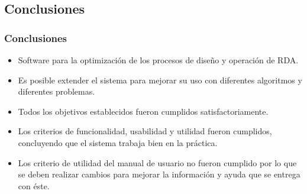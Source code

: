 \documentclass[9pt]{beamer}
\begin{document}
    \subsection{Conclusiones}
    \begin{frame}
        \frametitle{Conclusiones}                       
        
        \begin{itemize}
            \item Software para la optimización de los procesos de diseño y operación  de RDA.
            \item Es posible extender el sistema para mejorar su uso con diferentes algoritmos y diferentes problemas.
            \item Todos los objetivos establecidos fueron cumplidos satisfactoriamente.
            \item Los criterios de funcionalidad, usabilidad y utilidad fueron cumplidos, concluyendo que el sistema trabaja bien en la práctica. 
            \item Los criterio de utilidad del manual de usuario no fueron cumplido por lo que se deben realizar cambios para mejorar la información y ayuda que se entrega con éste.
        \end{itemize}
    
    \end{frame}
\end{document}
